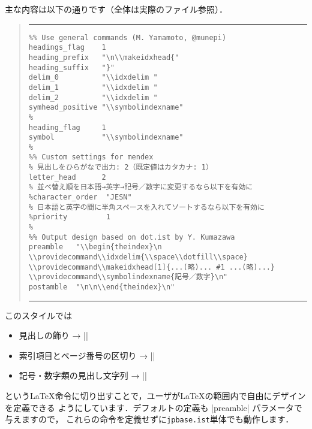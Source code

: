 \documentclass[a4paper,dvipdfmx]{jsarticle}
\newcommand{\FileName}[1]{\texttt{#1}}
\begin{document}
主な内容は以下の通りです（全体は実際のファイル参照）．
\begin{quote}
\hrule\vskip10pt\noautospacing\noautoxspacing
\begin{verbatim}
%% Use general commands (M. Yamamoto, @munepi)
headings_flag    1
heading_prefix   "\n\\makeidxhead{"
heading_suffix   "}"
delim_0          "\\idxdelim "
delim_1          "\\idxdelim "
delim_2          "\\idxdelim "
symhead_positive "\\symbolindexname"
%
heading_flag     1
symbol           "\\symbolindexname"
%
%% Custom settings for mendex
% 見出しをひらがなで出力: 2（既定値はカタカナ: 1）
letter_head      2
% 並べ替え順を日本語→英字→記号／数字に変更するなら以下を有効に
%character_order  "JESN"
% 日本語と英字の間に半角スペースを入れてソートするなら以下を有効に
%priority         1
%
%% Output design based on dot.ist by Y. Kumazawa
preamble   "\\begin{theindex}\n
\\providecommand\\idxdelim{\\space\\dotfill\\space}
\\providecommand\\makeidxhead[1]{...(略)... #1 ...(略)...}
\\providecommand\\symbolindexname{記号／数字}\n"
postamble  "\n\n\\end{theindex}\n"
\end{verbatim}
\vskip10pt\hrule
\end{quote}

このスタイルでは
\begin{itemize}
 \item 見出しの飾り → |\makeidxhead|
 \item 索引項目とページ番号の区切り → |\idxdelim|
 \item 記号・数字類の見出し文字列 → |\symbolindexname|
\end{itemize}
という\LaTeX 命令に切り出すことで，ユーザが\LaTeX の範囲内で自由にデザインを定義できる
ようにしています．デフォルトの定義も |preamble| パラメータで与えますので，
これらの命令を定義せずに\FileName{jpbase.ist}単体でも動作します．
\end{document}
